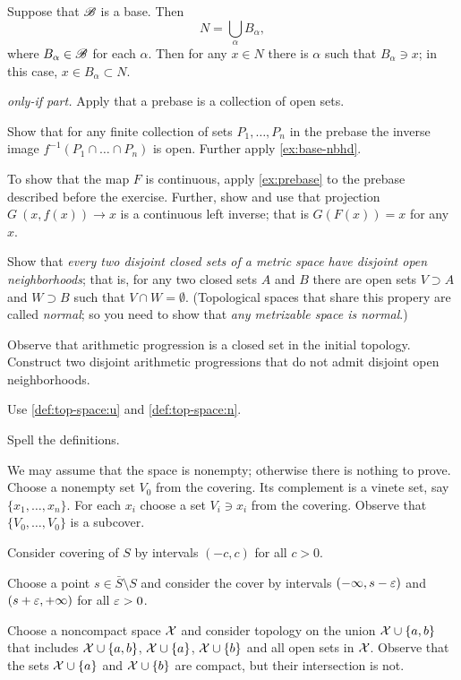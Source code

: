 \begin{multicols}{2}
 Suppose that $\mathscr{B}$ is a base.
Then 
\[N=\bigcup_{\alpha}B_\alpha,\]
where $B_\alpha\in \mathscr{B}$ for each $\alpha$.
Then for any $x\in N$ there is $\alpha$ such that $B_\alpha\ni x$;
in this case, $x\in B_\alpha\subset N$.

\parbf{\ref{ex:prebase};} \textit{only-if part.}
Apply that a prebase is a collection of open sets.

 Show that for any finite collection of sets $P_1,\dots,P_n$ in the prebase the inverse image 
$f^{-1}(P_1\cap\dots\cap P_n)$
is open.
Further apply \ref{ex:base-nbhd}.

 To show that the map $F$ is continuous,
apply \ref{ex:prebase} to the prebase described before the exercise.
Further, show and use that projection $G\:(x,f(x))\to x$ is a continuous left inverse;
that is $G(F(x))=x$ for any $x$.

Show that \textit{every two disjoint closed sets of a metric space have disjoint open neighborhoods};
that is, for any two closed sets $A$ and $B$ there are open sets $V\supset A$ and $W\supset B$ such that $V\cap W=\emptyset$.
(Topological spaces that share this propery are called \emph{normal};
so you need to show that \textit{any metrizable space is normal}.)

Observe that arithmetic progression is a closed set in the initial topology.
Construct two disjoint arithmetic progressions that do not admit disjoint open neighborhoods. 

Use \ref{def:top-space:u} and \ref{def:top-space:n}.

Spell the definitions.

We may assume that the space is nonempty; otherwise there is nothing to prove.
Choose a nonempty set $V_0$ from the covering.
Its complement is a vinete set, say $\{x_1,\dots,x_n\}$.
For each $x_i$ choose a set $V_i\ni x_i$ from the covering.
Observe that $\{V_0,\dots,V_0\}$ is a subcover.

Consider covering of $S$ by intervals $(-c,c)$ for all $c>0$.

Choose a point $s\in\bar S\setminus S$ and consider the cover by intervals $(-\infty, s-\varepsilon)$ and $(s+\varepsilon,+\infty)$ for all $\varepsilon>0$.

Choose a noncompact space $\mathcal{X}$ and consider topology on the union $\mathcal{X}\cup\{a,b\}$ that includes
$\mathcal{X}\cup\{a,b\}$, $\mathcal{X}\cup\{a\}$, $\mathcal{X}\cup\{b\}$ and all open sets in $\mathcal{X}$.
Observe that the sets $\mathcal{X}\cup\{a\}$ and $\mathcal{X}\cup\{b\}$ are compact, but their intersection is not.


\end{multicols}
